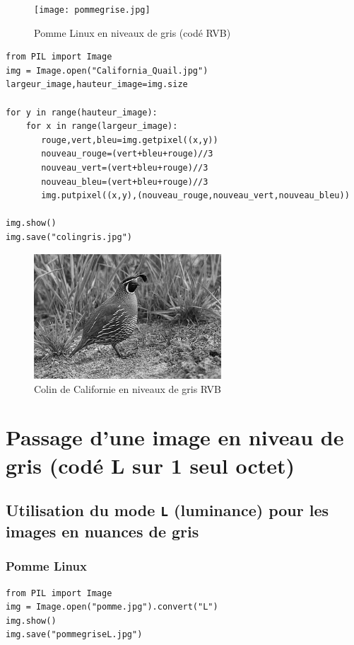 \documentclass[11pt]{article}
\begin{document}
\begin{figure}[htbp]
\centering
\texttt{[image: pommegrise.jpg]}
\caption{Pomme Linux en niveaux de gris (codé RVB)}
\end{figure}



\begin{verbatim}
from PIL import Image
img = Image.open("California_Quail.jpg")
largeur_image,hauteur_image=img.size

for y in range(hauteur_image):
    for x in range(largeur_image):
       rouge,vert,bleu=img.getpixel((x,y))
       nouveau_rouge=(vert+bleu+rouge)//3
       nouveau_vert=(vert+bleu+rouge)//3
       nouveau_bleu=(vert+bleu+rouge)//3
       img.putpixel((x,y),(nouveau_rouge,nouveau_vert,nouveau_bleu))

img.show()
img.save("colingris.jpg")
\end{verbatim}

\begin{figure}[htbp]
\centering
\includegraphics[width=7cm]{colingris.jpg}
\caption{Colin de Californie en niveaux de gris RVB}
\end{figure}

\section{Passage d'une image en niveau de gris (codé L sur 1 seul octet)}
\label{sec:org8e1858b}


\subsection{Utilisation du mode \texttt{L} (luminance) pour les images en nuances de gris}
\label{sec:orgb1a962a}
\subsubsection{Pomme Linux}
\label{sec:org13004af}

\begin{verbatim}
from PIL import Image
img = Image.open("pomme.jpg").convert("L")
img.show()
img.save("pommegriseL.jpg")
\end{verbatim}
\end{document}

